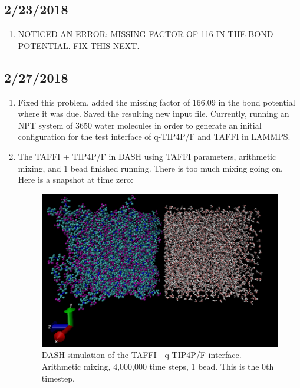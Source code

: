 \documentclass[12pt,reqno]{amsart}
\numberwithin{equation}{section}
\begin{document}
\subsection{2/23/2018}
\begin{enumerate}
\item NOTICED AN ERROR: MISSING FACTOR OF 116 IN THE BOND POTENTIAL.  FIX THIS NEXT. 
\end{enumerate}

\subsection{2/27/2018}
\begin{enumerate}
\item Fixed this problem, added the missing factor of 166.09 in the bond potential where it was due.  Saved the resulting new input file.  Currently, running an NPT system of 3650 water molecules in order to generate an initial configuration for the test interface of q-TIP4P/F and TAFFI in LAMMPS.  
\item The TAFFI + TIP4P/F in DASH using TAFFI parameters, arithmetic mixing, and 1 bead finished running.  There is too much mixing going on.  Here is a snapshot at time zero:

\begin{figure}[H]
\centering
\includegraphics[scale=0.7]{dash_taffi-tip4pF_arithmetic_1bead_0}
\caption{DASH simulation of the TAFFI - q-TIP4P/F interface.  Arithmetic mixing, 4,000,000 time steps, 1 bead.  This is the 0th timestep.}
\end{figure}


\end{enumerate}
\end{document}
